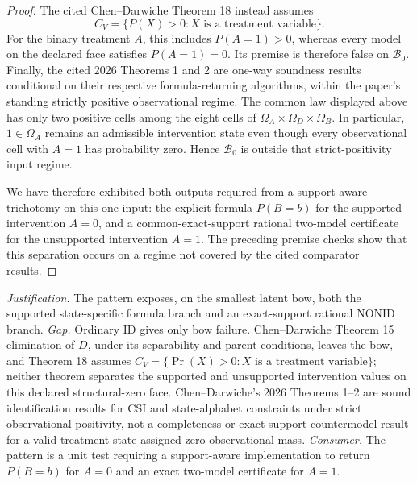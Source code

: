 \documentclass{article}
\begin{document}
\begin{proof}
The cited Chen--Darwiche Theorem 18 instead assumes
\[
 C_V=\{P(X)>0:X\text{ is a treatment variable}\}.
\]
For the binary treatment \(A\), this includes \(P(A=1)>0\), whereas every model on the declared face satisfies \(P(A=1)=0\).  Its premise is therefore false on \(\mathcal B_0\).  Finally, the cited 2026 Theorems 1 and 2 are one-way soundness results conditional on their respective formula-returning algorithms, within the paper's standing strictly positive observational regime.  The common law displayed above has only two positive cells among the eight cells of \(\Omega_A\times\Omega_D\times\Omega_B\).  In particular, \(1\in\Omega_A\) remains an admissible intervention state even though every observational cell with \(A=1\) has probability zero.  Hence \(\mathcal B_0\) is outside that strict-positivity input regime.

We have therefore exhibited both outputs required from a support-aware trichotomy on this one input: the explicit formula \(P(B=b)\) for the supported intervention \(A=0\), and a common-exact-support rational two-model certificate for the unsupported intervention \(A=1\).  The preceding premise checks show that this separation occurs on a regime not covered by the cited comparator results.
\end{proof}
\par\smallskip\noindent \textit{Justification.} The pattern exposes, on the smallest latent bow, both the supported state-specific formula branch and an exact-support rational NONID branch. \textit{Gap.} Ordinary ID gives only bow failure. Chen--Darwiche Theorem 15 elimination of \(D\), under its separability and parent conditions, leaves the bow, and Theorem 18 assumes \(C_V=\{\Pr(X)>0:X\text{ is a treatment variable}\}\); neither theorem separates the supported and unsupported intervention values on this declared structural-zero face. Chen--Darwiche's 2026 Theorems 1--2 are sound identification results for CSI and state-alphabet constraints under strict observational positivity, not a completeness or exact-support countermodel result for a valid treatment state assigned zero observational mass. \textit{Consumer.} The pattern is a unit test requiring a support-aware implementation to return \(P(B=b)\) for \(A=0\) and an exact two-model certificate for \(A=1\).
\end{document}
